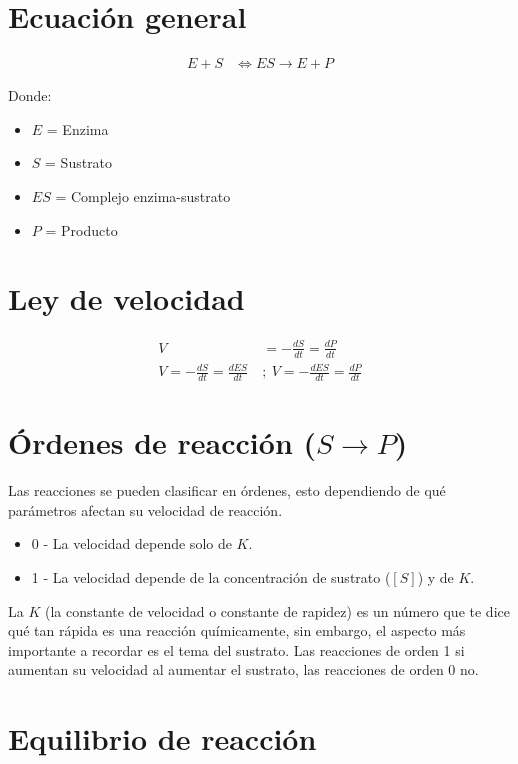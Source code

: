 \section{Ecuación general}

\begin{align*}
    E+S &\Longleftrightarrow ES \longrightarrow E + P
\end{align*}

Donde:

\begin{itemize}
    \item $E$ = Enzima
    \item $S$ = Sustrato
    \item $ES$ = Complejo enzima-sustrato
    \item $P$ = Producto
\end{itemize}

\section{Ley de velocidad}

\begin{align*}
    V &= -\frac{dS}{dt} = \frac{dP}{dt}
    \\
    V = -\frac{dS}{dt} = \frac{dES}{dt} \ &; \ V = -\frac{dES}{dt} = \frac{dP}{dt}
\end{align*}

\section{Órdenes de reacción ($S \longrightarrow P$)}

Las reacciones se pueden clasificar en órdenes, esto dependiendo de qué parámetros afectan su velocidad de reacción.

\begin{itemize}
    \item 0 - La velocidad depende solo de $K$.
    \item 1 - La velocidad depende de la concentración de sustrato ($[S]$) y de $K$.
\end{itemize}

La $K$ (la constante de velocidad o constante de rapidez) es un número que te dice qué tan rápida es una reacción químicamente, sin embargo, el aspecto más importante a recordar es el tema del sustrato. Las reacciones de orden 1 si aumentan su velocidad al aumentar el sustrato, las reacciones de orden 0 no.

\section{Equilibrio de reacción}

